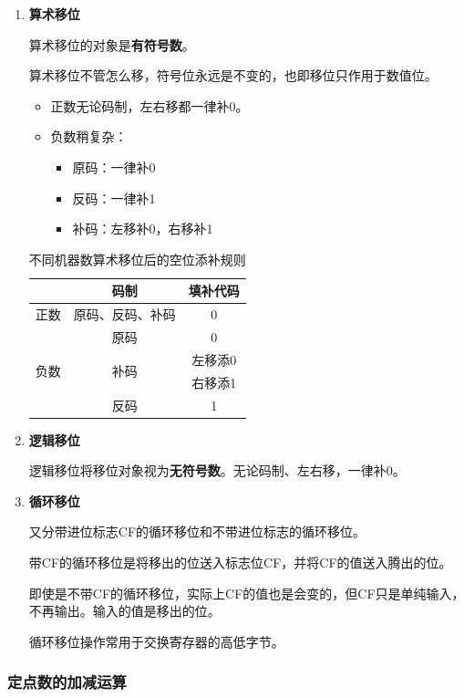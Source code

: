 \documentclass[12pt, a4paper, oneside]{ctexart}
\begin{document}
\begin{enumerate}
  \item {\bf 算术移位}
  
  算术移位的对象是\textbf{有符号数}。

  算术移位不管怎么移，符号位永远是不变的，也即移位只作用于数值位。

  \begin{itemize}
    \item 正数无论码制，左右移都一律补0。
    \item 负数稍复杂：
    \begin{itemize}
      \item 原码：一律补0
      \item 反码：一律补1
      \item 补码：左移补0，右移补1
    \end{itemize}
  \end{itemize}

  \begin{table}[!ht]
    \centering
    \caption{不同机器数算术移位后的空位添补规则}
    \begin{tabular}{|c|c|c|}
      \hline
      & 码制 & 填补代码 \\ \hline
      正数 & 原码、反码、补码 & 0 \\ \hline
      \multirow{4}{*}{负数} & 原码 & 0 \\ \cline{2-3}
      & \multirow{2}{*}{补码} & 左移添0 \\ \cline{3-3}
      & & 右移添1 \\ \cline{2-3}
      & 反码 & 1 \\
      \hline
    \end{tabular}
  \end{table}
  \item {\bf 逻辑移位}
  
  逻辑移位将移位对象视为\textbf{无符号数}。无论码制、左右移，一律补0。
  \item {\bf 循环移位}
  
  又分带进位标志CF的循环移位和不带进位标志的循环移位。

  带CF的循环移位是将移出的位送入标志位CF，并将CF的值送入腾出的位。

  即使是不带CF的循环移位，实际上CF的值也是会变的，但CF只是单纯输入，不再输出。输入的值是移出的位。

  循环移位操作常用于交换寄存器的高低字节。
\end{enumerate}

\subsubsection{定点数的加减运算}
\end{document}
